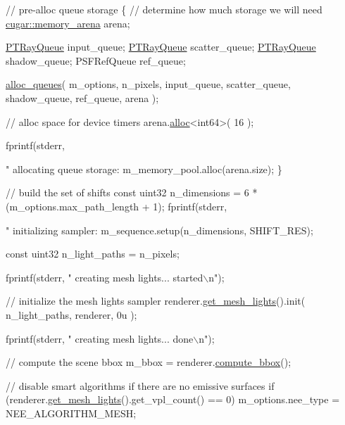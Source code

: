 \begin{DoxyCodeInclude}
{{{{{{{{{{{{{{{{    \textcolor{comment}{// pre-alloc queue storage}
    \{
        \textcolor{comment}{// determine how much storage we will need}
        \hyperlink{structcugar_1_1memory__arena}{cugar::memory\_arena} arena;

        \hyperlink{struct_p_t_ray_queue}{PTRayQueue}    input\_queue;
        \hyperlink{struct_p_t_ray_queue}{PTRayQueue}    scatter\_queue;
        \hyperlink{struct_p_t_ray_queue}{PTRayQueue}    shadow\_queue;
        PSFRefQueue ref\_queue;

        \hyperlink{group___p_t_lib_gaf8daef8b815f7712ff692edbaa628881}{alloc\_queues}(
            m\_options,
            n\_pixels,
            input\_queue,
            scatter\_queue,
            shadow\_queue,
            ref\_queue,
            arena );

        \textcolor{comment}{// alloc space for device timers}
        arena.\hyperlink{structcugar_1_1memory__arena_afcbc6673ae3fa3e61368495ed2041621}{alloc}<int64>( 16 );

        fprintf(stderr, \textcolor{stringliteral}{"  allocating queue storage: %
        m\_memory\_pool.alloc(arena.size);
    \}

    \textcolor{comment}{// build the set of shifts}
    \textcolor{keyword}{const} uint32 n\_dimensions = 6 * (m\_options.max\_path\_length + 1);
    fprintf(stderr, \textcolor{stringliteral}{"  initializing sampler: %
    m\_sequence.setup(n\_dimensions, SHIFT\_RES);

    \textcolor{keyword}{const} uint32 n\_light\_paths = n\_pixels;

    fprintf(stderr, \textcolor{stringliteral}{"  creating mesh lights... started\(\backslash\)n"});

    \textcolor{comment}{// initialize the mesh lights sampler}
    renderer.\hyperlink{struct_rendering_context_a076d2a2c86696da228fc6a49d55910ee}{get\_mesh\_lights}().init( n\_light\_paths, renderer, 0u );

    fprintf(stderr, \textcolor{stringliteral}{"  creating mesh lights... done\(\backslash\)n"});

    \textcolor{comment}{// compute the scene bbox}
    m\_bbox = renderer.\hyperlink{struct_rendering_context_acb44a2881eb6cf851f53428705a3351f}{compute\_bbox}();

    \textcolor{comment}{// disable smart algorithms if there are no emissive surfaces}
    \textcolor{keywordflow}{if} (renderer.\hyperlink{struct_rendering_context_a076d2a2c86696da228fc6a49d55910ee}{get\_mesh\_lights}().get\_vpl\_count() == 0)
        m\_options.nee\_type = NEE\_ALGORITHM\_MESH;

}}}}}}}}}}}}}}}}}}
\end{DoxyCodeInclude}
